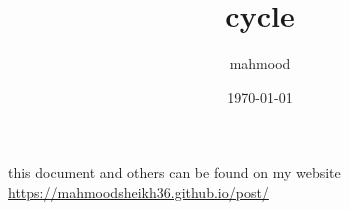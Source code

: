 \documentclass[a4paper,12pt]{article}
\author{mahmood}
\date{\today}
\title{cycle}
\begin{document}
\maketitle
\begin{note}
this document and others can be found on my website\\
\url{https://mahmoodsheikh36.github.io/post/}
\end{note}
\end{document}
